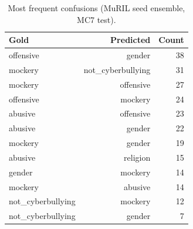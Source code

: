 \begin{table}[t]
\centering
\small
\caption{Most frequent confusions (MuRIL seed ensemble, MC7 test).}
\label{tab:tab11b_top_confusions}
\begin{tabular}{lrr}
\toprule
Gold & Predicted & Count \\
\midrule
offensive & gender & 38 \\
mockery & not\_cyberbullying & 31 \\
mockery & offensive & 27 \\
offensive & mockery & 24 \\
abusive & offensive & 23 \\
abusive & gender & 22 \\
mockery & gender & 19 \\
abusive & religion & 15 \\
gender & mockery & 14 \\
mockery & abusive & 14 \\
not\_cyberbullying & mockery & 12 \\
not\_cyberbullying & gender & 7 \\
\bottomrule
\end{tabular}
\end{table}
